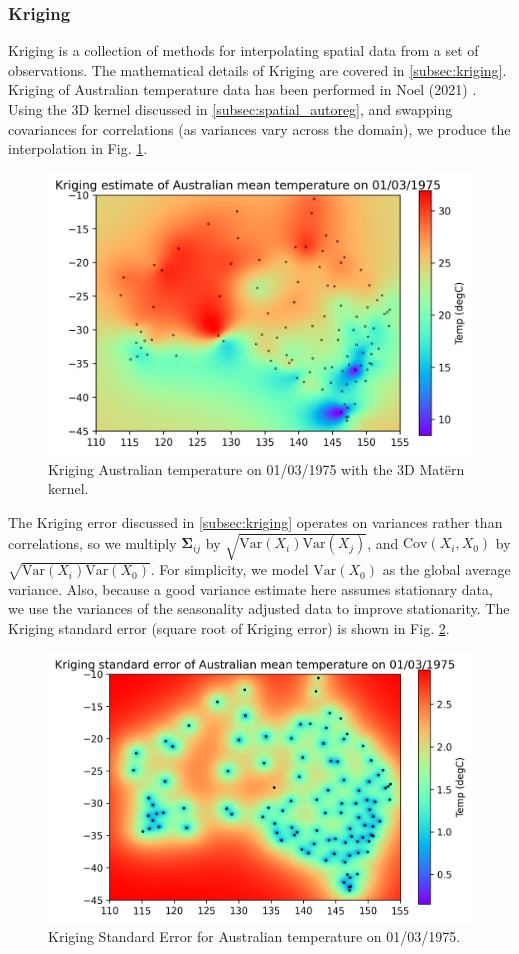 \documentclass[12pt,a4paper]{article} %
\begin{document}
\subsubsection{Kriging}
\label{subsec:kriging_implementation}
Kriging is a collection of methods for interpolating spatial data from a set of observations. The mathematical details of Kriging are covered in \ref{subsec:kriging}. Kriging of Australian temperature data has been performed in Noel (2021) \cite{cressie}. Using the 3D kernel discussed in \ref{subsec:spatial_autoreg}, and swapping covariances for correlations (as variances vary across the domain), we produce the interpolation in Fig. \ref{fig:krig}.

\begin{figure}[!ht]
    \centering
    \includegraphics[width=.8\linewidth]{mean_temp_model_krig.png}
    \caption{Kriging Australian temperature on 01/03/1975 with the 3D Mat\"{e}rn kernel.}
    \label{fig:krig}
\end{figure}

The Kriging error discussed in \ref{subsec:kriging} operates on variances rather than correlations, so we multiply $\pmb{\Sigma}_{ij}$ by $\sqrt{\text{Var}(X_i)\text{Var}(X_j)}$, and $\text{Cov}(X_i, X_0)$ by $\sqrt{\text{Var}(X_i)\text{Var}(X_0)}$. For simplicity, we model $\text{Var}(X_0)$ as the global average variance. Also, because a good variance estimate here assumes stationary data, we use the variances of the seasonality adjusted data to improve stationarity. The Kriging standard error (square root of Kriging error) is shown in Fig. \ref{fig:krig_err}.

\begin{figure}[!ht]
    \centering
    \includegraphics[width=.8\linewidth]{mean_temp_model_krig_error.png}
    \caption{Kriging Standard Error for Australian temperature on 01/03/1975.}
    \label{fig:krig_err}
\end{figure}
\end{document}
